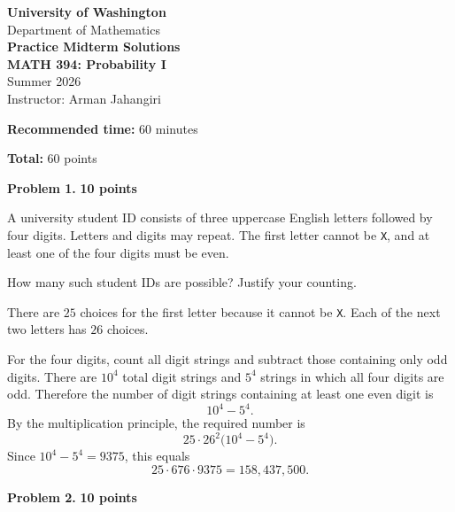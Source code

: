 \documentclass[11pt]{article}
\newcommand{\course}{MATH 394: Probability I}
\newcommand{\instructor}{Arman Jahangiri}
\newcommand{\department}{Department of Mathematics\\}
\newcommand{\university}{University of Washington}
\begin{document}
\begin{titlepage}
\centering
\vspace*{1.2cm}
{\Large \textbf{\university}}\\
{\large \department}
\vspace{1.4cm}
{\Huge \color{uwpurple}\textbf{Practice Midterm Solutions}}\\[0.25cm]
{\Large \textbf{\course}}\\[0.25cm]
{\large Summer 2026 \quad \\ \quad Instructor: \instructor}
\vspace{1cm}
\begin{tcolorbox}[width=0.78\textwidth,colback=softpurple,colframe=uwpurple,boxrule=0.9pt,arc=3mm]
\centering
\textbf{Recommended time:} 60 minutes

\textbf{Total:} 60 points
\end{tcolorbox}
\end{titlepage}

\begin{problemheader}
\textbf{Problem 1. } \hfill \textbf{10 points}
\end{problemheader}



A university student ID consists of three uppercase English letters followed by four digits. Letters and digits may repeat. The first letter cannot be \texttt{X}, and at least one of the four digits must be even.

How many such student IDs are possible? Justify your counting.


\begin{solutionbox}
There are $25$ choices for the first letter because it cannot be \texttt{X}. Each of the next two letters has $26$ choices.

For the four digits, count all digit strings and subtract those containing only odd digits. There are $10^4$ total digit strings and $5^4$ strings in which all four digits are odd. Therefore the number of digit strings containing at least one even digit is
\[
10^4-5^4.
\]
By the multiplication principle, the required number is
\[
25\cdot 26^2\bigl(10^4-5^4\bigr).
\]
Since $10^4-5^4=9375$, this equals
\[
25\cdot 676\cdot 9375=158{,}437{,}500.
\]

\end{solutionbox}

\newpage
\begin{problemheader}
\textbf{Problem 2. } \hfill \textbf{10 points}
\end{problemheader}
\end{document}
